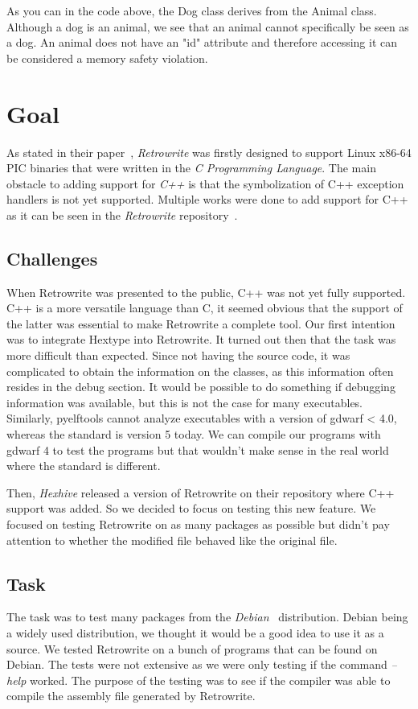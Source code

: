 \documentclass[a4paper,11pt,oneside]{report}
\newcommand{\sysname}{Retrowrite\xspace}
\begin{document}

As you can in the code above, the Dog class derives from the Animal class.
Although a dog is an animal, we see that an animal cannot specifically be seen
as a dog. An animal does not have an "id" attribute and therefore accessing it
can be considered a memory safety violation.



\chapter{Goal}
As stated in their paper~\cite{dinesh20oakland}, \textit{Retrowrite} was
firstly designed to support Linux x86-64 PIC binaries that were written in the
\textit{C Programming Language}. The main obstacle to adding support for
\textit{C++} is that the symbolization of C++ exception
handlers is not yet supported. Multiple works were done to add support
for C++ as it can be seen in the \textit{Retrowrite} repository~\cite{gitCommit}.


\section{Challenges}
When Retrowrite was presented to the public, C++ was not yet fully supported. 
C++ is a more versatile language than C, it seemed obvious that the
support of the latter was essential to make Retrowrite a complete tool. Our
first intention was to integrate Hextype into \sysname. It
turned out then that the task was more difficult than expected. Since not
having the source code, it was complicated to obtain the information on the
classes, as this information often resides in the debug section. It would be
possible to do something if debugging information was available, but this is
not the case for many executables.
Similarly, pyelftools cannot analyze executables with a version of gdwarf <
4.0, whereas the standard is version 5 today. We can compile our programs with
gdwarf 4 to test the programs but that wouldn't make sense in the real world
where the standard is different.

Then, \textit{Hexhive} released a version of \sysname on their repository
where C++ support was added. So we decided to focus on testing this new
feature.
We focused on testing \sysname on as many packages as possible but didn't
pay attention to whether the modified file behaved like the original
file.

\section{Task}
The task was to test many packages from the
\textit{Debian}~\cite{debian} distribution. Debian being a widely used
distribution, we thought it would be a good idea to use it as a source. 
We tested Retrowrite on a bunch of programs that can be found on Debian.
The tests were not extensive as we were only testing if the command
\textit{--help} worked. The purpose of the testing was to see if the compiler
was able to compile the assembly file generated by \sysname.
\end{document}
